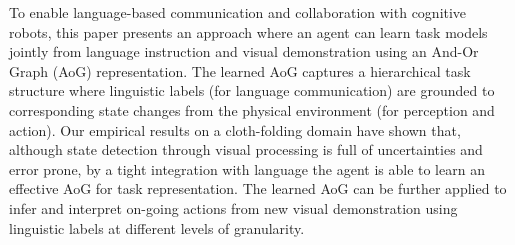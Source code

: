 To enable language-based communication and collaboration with cognitive robots, this paper presents an approach where an agent can learn task models jointly from language instruction and visual demonstration using an And-Or Graph (AoG) representation. The learned AoG captures a hierarchical task structure where linguistic labels (for language communication) are grounded to corresponding state changes from the physical environment (for perception and action). Our empirical results on a cloth-folding domain have shown that, although state detection through visual processing is full of uncertainties and error prone, by a tight integration with language the agent is able to learn an effective AoG for task representation. The learned AoG can be further applied to infer and interpret on-going actions from new visual demonstration using linguistic labels at different levels of granularity.
